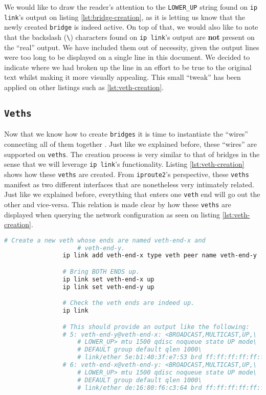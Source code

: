             We would like to draw the reader's attention to the \texttt{LOWER\_UP} string found on \texttt{ip link}'s output on listing \ref{lst:bridge-creation}, as it is letting us know that the newly created \texttt{bridge} is indeed active. On top of that, we would also like to note that the backslash (\texttt{\textbackslash}) characters found on \texttt{ip link}'s output are \textbf{not} present on the ``real'' output. We have included them out of necessity, given the output lines were too long to be displayed on a single line in this document. We decided to indicate where we had broken up the line in an effort to be true to the original text whilst making it more visually appealing. This small ``tweak'' has been applied on other listings such as \ref{lst:veth-creation}.\\

        \subsection{\texttt{Veths}}
            Now that we know how to create \texttt{bridges} it is time to instantiate the ``wires'' connecting all of them together \cite{bib:man-veth}. Just like we explained before, these ``wires'' are supported on \texttt{veths}. The creation process is very similar to that of bridges in the sense that we will leverage \texttt{ip link}'s functionality. Listing \ref{lst:veth-creation} shows how these \texttt{veths} are created. From \texttt{iproute2}'s perspective, these \texttt{veths} manifest as two different interfaces that are nonetheless very intimately related. Just like we explained before, everything that enters one \texttt{veth} end will go out the other and vice-versa. This relation is made clear by how these \texttt{veths} are displayed when querying the network configuration as seen on listing \ref{lst:veth-creation}.\\

            \begin{lstlisting}[language = bash, caption = Instantiating a Virtual Ethernet Interface., label = lst:veth-creation]
                # Create a new veth whose ends are named veth-end-x and
                    # veth-end-y.
                ip link add veth-end-x type veth peer name veth-end-y

                # Bring BOTH ENDS up.
                ip link set veth-end-x up
                ip link set veth-end-y up

                # Check the veth ends are indeed up.
                ip link

                # This should provide an output like the following:
                # 5: veth-end-y@veth-end-x: <BROADCAST,MULTICAST,UP,\
                    # LOWER_UP> mtu 1500 qdisc noqueue state UP mode\
                    # DEFAULT group default qlen 1000\
                    # link/ether 5e:b1:40:3f:e7:53 brd ff:ff:ff:ff:ff:ff
                # 6: veth-end-x@veth-end-y: <BROADCAST,MULTICAST,UP,\
                    # LOWER_UP> mtu 1500 qdisc noqueue state UP mode\
                    # DEFAULT group default qlen 1000\
                    # link/ether de:16:80:f6:c3:64 brd ff:ff:ff:ff:ff:ff
            \end{lstlisting}

